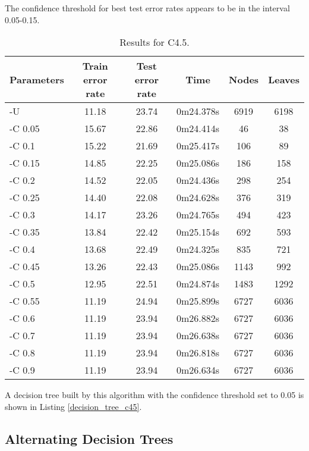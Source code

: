 \documentclass[a4paper]{llncs}
\begin{document}
The confidence threshold for best test error rates appears to be in the interval 0.05-0.15.   

\begin{table}[ht]
  \begin{center}
  \begin{tabular}{ | l | c | c | c | c | c |}
    \hline
    \textbf{Parameters} & \textbf{Train error rate} & \textbf{Test error rate} & \textbf{Time} & \textbf{Nodes} & \textbf{Leaves} \\ \hline
    -U & 11.18 & 23.74 & 0m24.378s & 6919 & 6198 \\ \hline
    -C 0.05 & 15.67 & 22.86 & 0m24.414s & 46 & 38 \\ \hline
    -C 0.1 & 15.22 & 21.69 & 0m25.417s & 106 & 89 \\ \hline
    -C 0.15 & 14.85 & 22.25 & 0m25.086s & 186 & 158 \\ \hline
    -C 0.2 & 14.52 & 22.05 & 0m24.436s & 298 & 254 \\ \hline
    -C 0.25 & 14.40 & 22.08 & 0m24.628s & 376 & 319 \\ \hline
    -C 0.3 & 14.17 & 23.26 & 0m24.765s & 494 & 423 \\ \hline
    -C 0.35 & 13.84 & 22.42 & 0m25.154s & 692 & 593 \\ \hline
    -C 0.4 & 13.68 & 22.49 & 0m24.325s & 835 & 721 \\ \hline
    -C 0.45 & 13.26 & 22.43 & 0m25.086s & 1143 & 992 \\ \hline
    -C 0.5 & 12.95 & 22.51 & 0m24.874s & 1483 & 1292 \\ \hline
    -C 0.55 & 11.19 & 24.94 & 0m25.899s & 6727 & 6036 \\ \hline
    -C 0.6 & 11.19 & 23.94 & 0m26.882s & 6727 & 6036 \\ \hline
    -C 0.7 & 11.19 & 23.94 & 0m26.638s & 6727 & 6036 \\ \hline
    -C 0.8 & 11.19 & 23.94 & 0m26.818s & 6727 & 6036 \\ \hline
    -C 0.9 & 11.19 & 23.94 & 0m26.634s & 6727 & 6036 \\ \hline
  \end{tabular}
  \caption{Results for C4.5.}
  \label{tbl:results_c45}
  \end{center}
\end{table}

A decision tree built by this algorithm with the confidence threshold set to 0.05 is shown in Listing \ref{decision_tree_c45}.

\subsection{Alternating Decision Trees}
\end{document}
